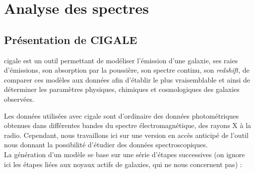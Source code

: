 \documentclass[12pt, a4paper]{article}
\begin{document}
\section{Analyse des spectres}

\subsection{Présentation de CIGALE}

\gls{cigale} \parencite{cigale} est un outil permettant de modéliser l'émission d'une galaxie, ses raies d'émissions, son absorption par la poussière, son spectre continu, son \textit{redshift}, de comparer ces modèles aux données afin d'établir le plus vraisemblable et ainsi de déterminer les paramètres physiques, chimiques et cosmologiques des galaxies observées.

Les données utilisées avec \gls{cigale} sont d'ordinaire des données photométriques obtenues dans différentes bandes du spectre électromagnétique, des rayons X à la radio. Cependant, nous travaillons ici sur une version en accès anticipé de l'outil nous donnant la possibilité d'étudier des données spectroscopiques.\\

La génération d'un modèle se base sur une série d'étapes successives (on ignore ici les étapes liées aux noyaux actifs de galaxies, qui ne nous concernent pas) :
\end{document}
